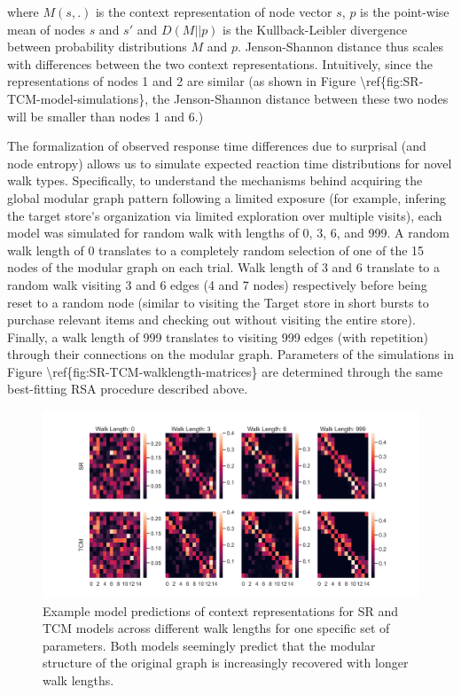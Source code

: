 where $M(s, .)$ is the context representation of node vector $s$, $p$ is the point-wise mean of nodes $s$ and $s'$ and $D(M||p)$ is the Kullback-Leibler divergence between probability distributions $M$ and $p$. \ac{Jenson-Shannon distance thus scales with differences between the two context representations. Intuitively, since the representations of nodes 1 and 2 are similar (as shown in Figure \ref{fig:SR-TCM-model-simulations}, the Jenson-Shannon distance between these two nodes will be smaller than nodes 1 and 6.)}

The formalization of observed response time differences due to surprisal (and node entropy) allows us to simulate expected reaction time distributions for novel walk types. Specifically, to understand the mechanisms behind acquiring the global modular graph pattern following a limited exposure \ac{(for example, infering the target store's organization via limited exploration over multiple visits)}, each model was simulated for random walk with lengths of 0, 3, 6, and 999. A random walk length of 0 translates to a completely random selection of one of the 15 nodes of the modular graph on each trial. Walk length of 3 and 6 translate to a random walk visiting 3 and 6 edges (4 and 7 nodes) respectively before being reset to a random node (similar to visiting the Target store in short bursts to purchase relevant items and checking out without visiting the entire store). Finally, a walk length of 999 translates to visiting 999 edges (with repetition) through their connections on the modular graph. \ac{Parameters of the simulations in Figure \ref{fig:SR-TCM-walklength-matrices} are determined through the same best-fitting RSA procedure described above.} 

\begin{figure}
	\centering
	\includegraphics[width = \textwidth]{chapter_notebooks/chapter_2/figures/walk_length_SR_TCM_matrices.png}
	\caption{\ac{Example} model predictions of context representations for SR and TCM models across different walk lengths for \ac{one specific set of parameters}. Both models seemingly predict that the modular structure of the original graph is increasingly recovered with longer walk lengths.}
	\label{fig:SR-TCM-walklength-matrices}
\end{figure}

